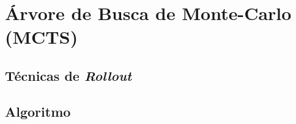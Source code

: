\documentclass{article}
\begin{document}
    \section{Árvore de Busca de Monte-Carlo (MCTS)}
    
        \subsection{Técnicas de \textit{Rollout}}
        
        \subsection{Algoritmo}
\end{document}
